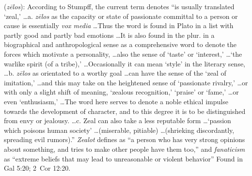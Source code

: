 \item[Fanaticism,]

(\textit{zēlos}):
According to Stumpff, the current term denotes ``is usually translated `zeal,' \ldots a. \emph{zēlos} as the capacity or state of passionate committal to a person or cause is essentially \emph{vox media} \ldots Thus the word is found in Plato in a list with partly good and partly bad emotions \ldots It is also found in the plur. in a biographical and anthropological sense as a comprehensive word to denote the forces which motivate a personality, \ldots also the sense of `taste' or `interest,' \ldots `the warlike spirit (of a tribe),' \ldots Occasionally it can mean `style' in the literary sense, \ldots b. \emph{zēlos} as orientated to a worthy goal \ldots can have the sense of  the `zeal of imitation,' \ldots and this may take on the heightened sense of `passionate rivalry,' \ldots or with only a slight shift of meaning, `zealous recognition,' `praise' or `fame,' \ldots or even `enthusiasm,' \ldots The word here serves  to denote a noble ethical impulse towards the development of character, and to this degree it is to be distinguished from envy or jealousy. \ldots c. Zeal can also take a less reputable form \ldots `passion which poisons human society' \ldots (miserable, pitiable) \ldots (shrieking discordantly, spreading evil rumors).''
\emph{Zealot} defines as ``a person who has very strong opinions about something, and tries to make other people have them too,'' and \emph{fanaticism} as ``extreme beliefs that may lead to unreasonable or violent behavior''
Found in Gal 5:20; 2~Cor 12:20.
